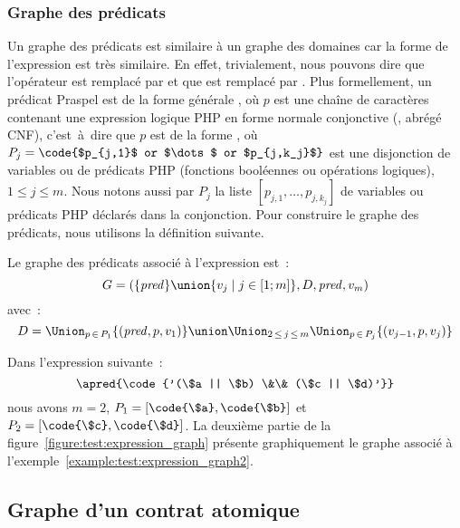 \subsubsection{Graphe des prédicats}

Un graphe des prédicats est similaire à un graphe des domaines car la forme de
l'expression est très similaire. En effet, trivialement, nous pouvons dire que
l'opérateur  est remplacé par \code{\&\&} et que  est
remplacé par \code{||}. Plus formellement, un prédicat Praspel est de la forme
générale , où $p$ est une chaîne de caractères contenant une expression
logique PHP en forme normale conjonctive (,
abrégé CNF), c'est~à~dire que $p$ est de la forme , où $P_j = \code{$p_{j,1}$ or $\dots$ or $p_{j,k_j}$}$ est une
disjonction de variables ou de prédicats PHP (fonctions booléennes ou opérations
logiques), $1 \leq j \leq m$. Nous notons aussi par $P_j$ la liste $[p_{j,1},
\dots, p_{j,k_j}]$ de variables ou prédicats PHP déclarés dans la conjonction.
Pour construire le graphe des prédicats, nous utilisons la définition suivante.

\begin{definition}

Le {\strong graphe des prédicats} associé à l'expression  est~:
%
$$G = (\{\mathit{pred}\} \union \{v_j \;\vert\; j \in [1; m]\}, D, \mathit{pred}, v_m)$$
%
avec~:
$$D = \Union_{p \,\in\, P_1} \{(\mathit{pred}, p, v_1)\} \union
      \Union_{2 \,\leq\, j \,\leq\, m}
      \Union_{p \,\in\, P_j} \{(v_{j - 1}, p, v_j)\}$$

\end{definition}

\begin{example}
\label{example:test:expression_graph2}

Dans l'expression suivante~:
%
$$\apred{\code{'(\$a || \$b) \&\& (\$c || \$d)'}}$$
%
nous avons $m = 2$, $P_1 = [\code{\$a}, \code{\$b}]$ et $P_2 = [\code{\$c},
\code{\$d}]$. La deuxième partie de la
figure~\ref{figure:test:expression_graph} présente graphiquement le graphe
associé à l'exemple~\ref{example:test:expression_graph2}.

\end{example}

\subsection{Graphe d'un contrat atomique}
\label{subsection:test:atomic_graph}

